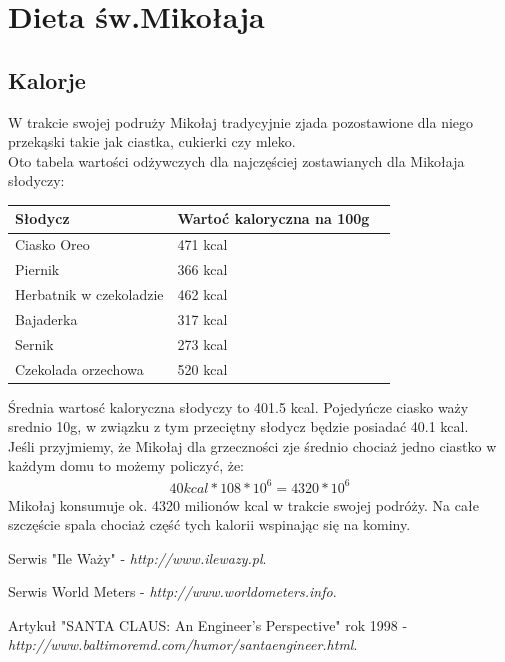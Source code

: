 \documentclass[12pt, a4paper]{article}
\begin{document}
\section{Dieta św.Mikołaja}
\subsection{Kalorje}
W trakcie swojej podruży Mikołaj tradycyjnie zjada pozostawione dla niego przekąski takie jak ciastka, cukierki czy mleko.\\
\newline
Oto tabela wartości odżywczych dla najczęściej zostawianych dla Mikołaja słodyczy:
\begin{center}
\begin{tabular}{| l | l | l |}
\hline
 Słodycz & Wartoć kaloryczna na 100g\\ \hline
Ciasko Oreo & 471 kcal\\ \hline
Piernik & 366 kcal\\ \hline
Herbatnik w czekoladzie& 462 kcal\\ \hline
Bajaderka & 317 kcal\\ \hline
Sernik & 273 kcal\\ \hline
Czekolada orzechowa & 520 kcal\\ \hline
\end{tabular}
\end{center}
\par Średnia wartosć kaloryczna słodyczy to 401.5 kcal. 
Pojedyńcze ciasko waży srednio 10g, w związku z tym przeciętny słodycz będzie posiadać 40.1 kcal.\\
Jeśli przyjmiemy, że Mikołaj dla grzeczności zje średnio chociaż jedno ciastko w każdym domu to możemy policzyć, że:
\begin{gather*}
 40kcal*108*10^6 = 4320*10^6
\end{gather*} 
Mikołaj konsumuje ok. 4320 milionów kcal w trakcie swojej podróży. Na całe szczęście spala chociaż część tych kalorii wspinając się na kominy.

\begin{thebibliography}{9}
Serwis "Ile Waży" - 
\textit{http://www.ilewazy.pl}. 
 
Serwis World Meters - 
\textit{http://www.worldometers.info}. 
 
Artykuł "SANTA CLAUS: An Engineer's Perspective" rok 1998 - 
\textit{http://www.baltimoremd.com/humor/santaengineer.html}. 
\end{thebibliography}
\end{document}
